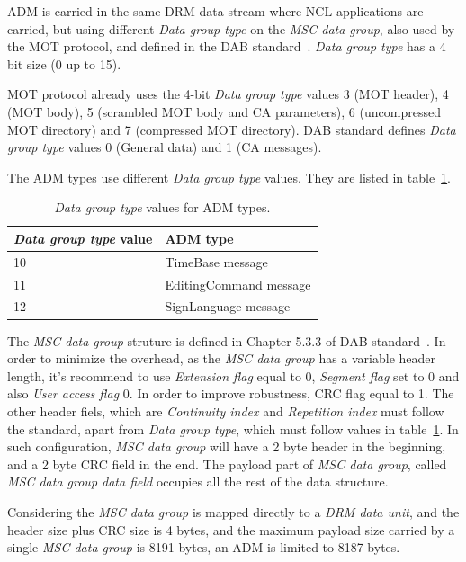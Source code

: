 \documentclass[11pt]{article}
\begin{document}
\begin{appendices}
ADM is carried in the same DRM data stream where NCL applications are
carried, but using different \emph{Data group type} on the
\emph{MSC data group}, also used by the MOT protocol, and defined in the DAB
standard~\cite{ETSI-300401-2006}. \emph{Data group type} has a 4 bit size
(0 up to 15).

MOT protocol already uses the 4-bit \emph{Data group type} values 3 (MOT
header), 4 (MOT body), 5 (scrambled MOT body and CA parameters), 6
(uncompressed MOT directory) and 7 (compressed MOT directory). DAB standard
defines \emph{Data group type} values 0 (General data) and 1 (CA messages).

The ADM types use different \emph{Data group type} values. They are listed
in table~\ref{tableadmtypes}.

\begin{table}[H]
\centering
\caption{\emph{Data group type} values for ADM types.}
\label{tableadmtypes}
\begin{tabular}{|l|l|}
  \hline
  \emph{Data group type} value & ADM type \\
  \hline
  10 & TimeBase message \\
  \hline
  11 & EditingCommand message \\
  \hline
  12 & SignLanguage message \\
  \hline
\end{tabular}
\end{table}

The \emph{MSC data group} struture is defined in Chapter 5.3.3 of DAB
standard~\cite{ETSI-300401-2006}. In order to minimize the overhead, as
the \emph{MSC data group} has a variable header length, it's
recommend to use \emph{Extension flag} equal to 0, \emph{Segment flag} set
to 0 and also \emph{User access flag} 0. In order to improve robustness,
CRC flag equal to 1. The other header fiels, which are \emph{Continuity
index} and \emph{Repetition index} must follow the standard, apart from
\emph{Data group type}, which must follow values in
table~\ref{tableadmtypes}. In such configuration, \emph{MSC data group} will
have a 2 byte header in the beginning, and a 2 byte CRC field in the end.
The payload part of \emph{MSC data group}, called \emph{MSC data group data
field} occupies all the rest of the data structure.

Considering the \emph{MSC data group} is mapped directly to a \emph{DRM data
  unit}, and the header size plus CRC size is 4 bytes, and the maximum
payload size carried by a single \emph{MSC data group} is 8191 bytes, an
ADM is limited to 8187 bytes.


\end{appendices}
\end{document}
